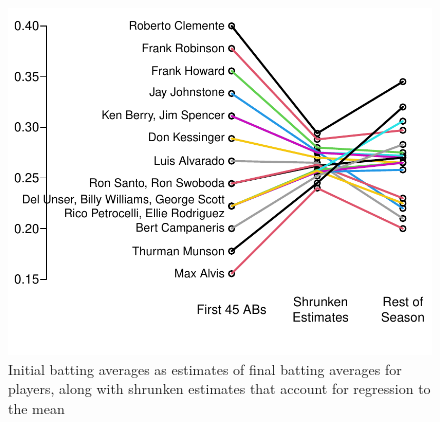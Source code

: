 \begin{Schunk}
\begin{figure}[htbp]
\centerline{\includegraphics[width=\maxwidth]{change-baseball-1} }

\caption[Baseball batting averages and regression to the mean]{Initial batting averages as estimates of final batting averages for players, along with shrunken estimates that account for regression to the mean}\label{fig:change-baseball}
\end{figure}
\end{Schunk}
